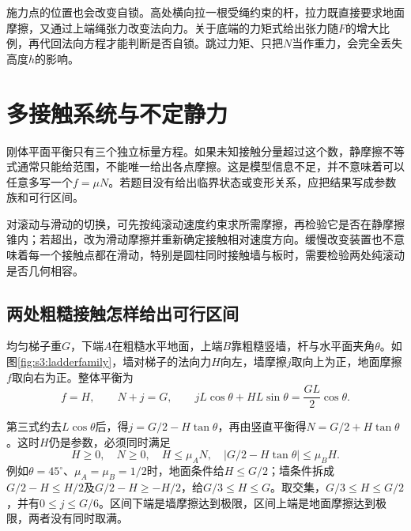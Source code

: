 施力点的位置也会改变自锁。高处横向拉一根受绳约束的杆，拉力既直接要求地面摩擦，又通过上端绳张力改变法向力。关于底端的力矩式给出张力随$F$的增大比例，再代回法向方程才能判断是否自锁。跳过力矩、只把$N$当作重力，会完全丢失高度$h$的影响。


\section{多接触系统与不定静力}
刚体平面平衡只有三个独立标量方程。如果未知接触分量超过这个数，静摩擦不等式通常只能给范围，不能唯一给出各点摩擦。这是模型信息不足，并不意味着可以任意多写一个$f=\mu N$。若题目没有给出临界状态或变形关系，应把结果写成参数族和可行区间。

对滚动与滑动的切换，可先按纯滚动速度约束求所需摩擦，再检验它是否在静摩擦锥内；若超出，改为滑动摩擦并重新确定接触相对速度方向。缓慢改变装置也不意味着每一个接触点都在滑动，特别是圆柱同时接触墙与板时，需要检验两处纯滚动是否几何相容。

\subsection{两处粗糙接触怎样给出可行区间}
均匀梯子重$G$，下端$A$在粗糙水平地面，上端$B$靠粗糙竖墙，杆与水平面夹角$\theta$。如图\ref{fig:s3:ladderfamily}，墙对梯子的法向力$H$向左，墙摩擦$j$取向上为正，地面摩擦$f$取向右为正。整体平衡为
\[
f=H,\qquad N+j=G,\qquad
jL\cos\theta+HL\sin\theta=\frac{GL}{2}\cos\theta.
\]

第三式约去$L\cos\theta$后，得$j=G/2-H\tan\theta$，再由竖直平衡得$N=G/2+H\tan\theta$。这时$H$仍是参数，必须同时满足
\[
H\ge0,\quad N\ge0,\quad H\le\mu_A N,
\quad |G/2-H\tan\theta|\le\mu_BH.
\]
例如$\theta=45^\circ$、$\mu_A=\mu_B=1/2$时，地面条件给$H\le G/2$；墙条件拆成$G/2-H\le H/2$及$G/2-H\ge-H/2$，给$G/3\le H\le G$。取交集，$G/3\le H\le G/2$，并有$0\le j\le G/6$。区间下端是墙摩擦达到极限，区间上端是地面摩擦达到极限，两者没有同时取满。

